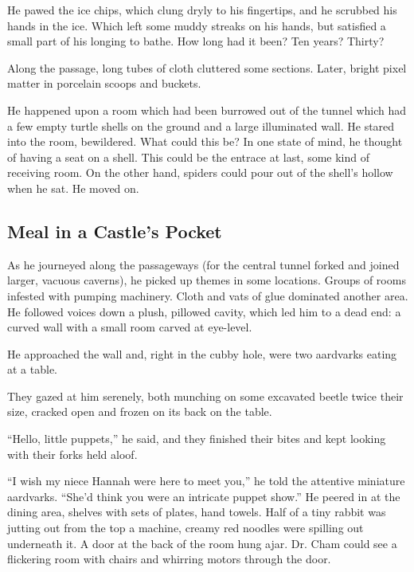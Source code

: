 \documentclass[12pt,twoside]{report}
\begin{document}
He pawed the ice chips, which clung dryly to his fingertips, and he
scrubbed his hands in the ice.  Which left some muddy streaks on his
hands, but satisfied a small part of his longing to bathe. How long
had it been?  Ten years?  Thirty?

Along the passage, long tubes of cloth cluttered some sections.
Later, bright pixel matter in porcelain scoops and buckets.

He happened upon a room which had been burrowed out of the tunnel
which had a few empty turtle shells on the ground and a large
illuminated wall.  He stared into the room, bewildered.  What could
this be?  In one state of mind, he thought of having a seat on a
shell.  This could be the entrace at last, some kind of receiving
room.  On the other hand, spiders could pour out of the shell's hollow
when he sat.  He moved on.



\subsection{Meal in a Castle's Pocket}



As he journeyed along the passageways (for the central tunnel forked
and joined larger, vacuous caverns), he picked up themes in some
locations.  Groups of rooms infested with pumping machinery.  Cloth
and vats of glue dominated another area.  He followed voices down a
plush, pillowed cavity, which led him to a dead end: a curved wall
with a small room carved at eye-level.

He approached the wall and, right in the cubby hole, were two
aardvarks eating at a table.

They gazed at him serenely, both munching on some excavated beetle
twice their size, cracked open and frozen on its back on the table.

``Hello, little puppets,'' he said, and they finished their bites and
kept looking with their forks held aloof.

``I wish my niece Hannah were here to meet you,'' he told the
attentive miniature aardvarks.  ``She'd think you were an intricate
puppet show.''  He peered in at the dining area, shelves with sets of
plates, hand towels.  Half of a tiny rabbit was jutting out from the
top a machine, creamy red noodles were spilling out underneath it.  A
door at the back of the room hung ajar.  Dr. Cham could see a
flickering room with chairs and whirring motors through the door.
\end{document}
